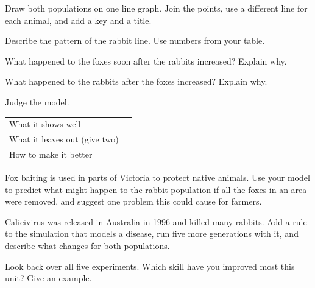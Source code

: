 \task Draw both populations on one line graph. Join the points, use a different line for each animal, and add a key and a title. 
\graphgrid{10cm}


\task Describe the pattern of the rabbit line. Use numbers from your table. 
\answerbox{4cm}

\task What happened to the foxes soon after the rabbits increased? Explain why.
\answerbox{4cm}

\task What happened to the rabbits after the foxes increased? Explain why.
\answerbox{4cm}

\task Judge the model. 
\begin{ctab}
\begin{tabular}{|W{4.4cm}|W{10.4cm}|}
  \hline{} &  \\ \hline
  What it shows well & \rule{0pt}{1.6cm} \\ \hline
  What it leaves out (give two) & \rule{0pt}{2.2cm} \\ \hline
  How to make it better & \rule{0pt}{1.6cm} \\ \hline
\end{tabular}
\end{ctab}

\task Fox baiting is used in parts of Victoria to protect native animals. Use your model to predict what might happen to the rabbit population if all the foxes in an area were removed, and suggest one problem this could cause for farmers.
\answerbox{5cm}

\begin{yr8box}
\begin{keepext}
\exttask Calicivirus was released in Australia in 1996 and killed many rabbits. Add a rule to the simulation that models a disease, run five more generations with it, and describe what changes for both populations.
\answerbox{6cm}
\end{keepext}
\end{yr8box}


\begin{skillcheck}
\end{skillcheck}

\task Look back over all five experiments. Which skill have you improved most this unit? Give an example.
\answerbox{5cm}


